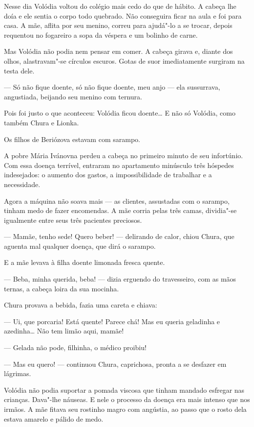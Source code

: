 \asterisc

Nesse dia Volódia voltou do colégio mais cedo do que de hábito. A cabeça
lhe doía e ele sentia o corpo todo quebrado. Não conseguira ficar na
aula e foi para casa. A mãe, aflita por seu menino, correu para ajudá"-lo
a se trocar, depois requentou no fogareiro a sopa da véspera e um
bolinho de carne.

Mas Volódia não podia nem pensar em comer. A cabeça girava e, diante dos
olhos, alastravam"-se círculos escuros. Gotas de suor imediatamente
surgiram na testa dele.

--- Só não fique doente, só não fique doente, meu anjo --- ela
sussurrava, angustiada, beijando seu menino com ternura.

Pois foi justo o que aconteceu: Volódia ficou doente\ldots{} E não só
Volódia, como também Chura e Lionka.

Os filhos de Beriózova estavam com sarampo.

A pobre Mária Ivánovna perdeu a cabeça no primeiro minuto de seu
infortúnio. Com essa doença terrível, entraram no apartamento minúsculo
três hóspedes indesejados: o aumento dos gastos, a impossibilidade de
trabalhar e a necessidade.

Agora a máquina não soava mais --- as clientes, assustadas com o
sarampo, tinham medo de fazer encomendas. A mãe corria pelas três camas,
dividia"-se igualmente entre seus três pacientes preciosos.

--- Mamãe, tenho sede! Quero beber! --- delirando de calor, chiou Chura,
que aguenta mal qualquer doença, que dirá o sarampo.

E a mãe levava à filha doente limonada fresca quente.

--- Beba, minha querida, beba! --- dizia erguendo do travesseiro, com as
mãos ternas, a cabeça loira da sua mocinha.

Chura provava a bebida, fazia uma careta e chiava:

--- Ui, que porcaria! Está quente! Parece chá! Mas eu queria geladinha e
azedinha\ldots{} Não tem limão aqui, mamãe!

--- Gelada não pode, filhinha, o médico proibiu!

--- Mas eu quero! --- continuou Chura, caprichosa, pronta a se desfazer
em lágrimas.

Volódia não podia suportar a pomada viscosa que tinham mandado esfregar
nas crianças. Dava"-lhe náuseas. E nele o processo da doença era mais
intenso que nos irmãos. A mãe fitava seu rostinho magro com angústia, ao
passo que o rosto dela estava amarelo e pálido de medo.

